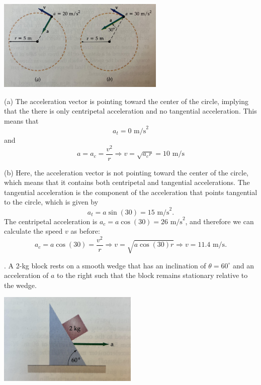 \documentclass[11pt,letterpaper]{article}
\newcommand{\sol}[1]{{\color{White} #1}} %
\begin{document}
\includegraphics[width=0.6\textwidth]{exam1_2.jpg}

\sol{(a) The acceleration vector is pointing toward the center of the circle, implying that the there is only centripetal acceleration and no tangential acceleration. This means that
\begin{equation}
\boxed{a_t = 0\mbox{ m/s}^2}
\end{equation}
and 
\begin{equation}
a = a_c = \frac{v^2}{r} \Rightarrow \boxed{v=\sqrt{a_cr}=10\mbox{ m/s}}
\end{equation}

(b) Here, the acceleration vector is not pointing toward the center of the circle, which means that it contains both centripetal and tangential accelerations. The tangential acceleration is the component of the acceleration that points tangential to the circle, which is given by
\begin{equation}
\boxed{a_t = a\sin(30) = 15\mbox{ m/s}^2}.
\end{equation}
The centripetal acceleration is $a_c=a\cos(30) = 26\mbox{ m/s}^2$, and therefore we can calculate the speed $v$ as before:
\begin{equation}
a_c = a\cos(30) = \frac{v^2}{r} \Rightarrow v = \sqrt{a\cos(30)r} \Rightarrow \boxed{v= 11.4\mbox{ m/s}}.
\end{equation}



}

. A 2-kg block rests on a smooth wedge that has an inclination of $\theta=60^\circ$ and an acceleration of $a$ to the right such that the block remains stationary relative to the wedge. 

\includegraphics[width=0.5\textwidth]{./exam1_3.jpg}
\end{document}
